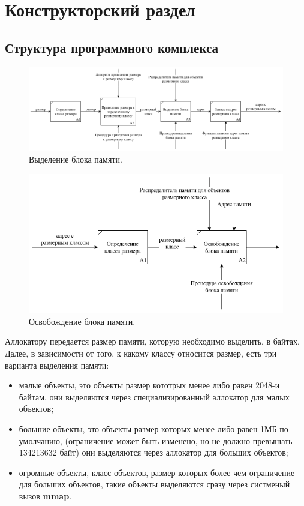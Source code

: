 \chapter{Конструкторский раздел}
\section{Структура программного комплекса}
\begin{figure}[!h]
	\begin{center}
		\includegraphics[scale=0.5]{images/block-allocation.png}
		\caption{Выделение блока памяти.}
		\label{block-allocation}
	\end{center}
\end{figure}

\begin{figure}[!h]
	\begin{center}
		\includegraphics[scale=0.5]{images/block-free.png}
		\caption{Освобождение блока памяти.}
		\label{block-free}
	\end{center}
\end{figure}

Аллокатору передается размер памяти, которую необходимо выделить, в байтах. Далее, в зависимости от того, к какому классу относится размер, есть три варианта выделения памяти:
\begin{itemize}
	\item малые объекты, это объекты размер кототрых менее либо равен 2048-и байтам, они выделяются через специализированный аллокатор для малых объектов;
	\item большие объекты, это объекты размер которых менее либо равен 1МБ по умолчанию, (ограничение может быть изменено, но не должно превышать 134213632 байт) они выделяются через аллокатор для больших объектов;
	\item огромные объекты, класс объектов, размер которых более чем ограничение для больших объектов, такие объекты выделяются сразу через систменый вызов \textbf{mmap}.
\end{itemize}


